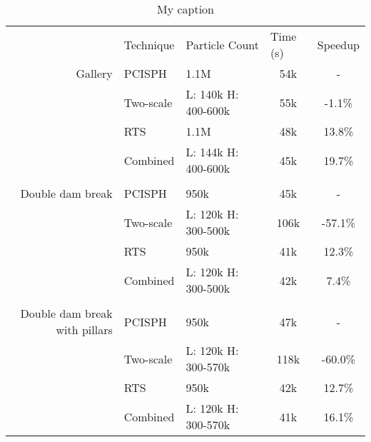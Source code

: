 \begin{table}[]
\centering
\caption{My caption}
\label{my-label}
\begin{tabular}{rllcc}
\multicolumn{1}{l}{}          & Technique & Particle Count      & \multicolumn{1}{l}{Time (s)} & \multicolumn{1}{l}{Speedup} \\ \cline{2-5} 
Gallery                       & PCISPH    & 1.1M                & 54k                          & -                           \\
                              & Two-scale & L: 140k H: 400-600k & 55k                          & -1.1\%                      \\
                              & RTS       & 1.1M                & 48k                          & 13.8\%                      \\
                              & Combined  & L: 144k H: 400-600k & 45k                          & 19.7\%                      \\
                              &           &                     &                              &                             \\
Double dam break              & PCISPH    & 950k                & 45k                          & -                           \\
                              & Two-scale & L: 120k H: 300-500k & 106k                         & -57.1\%                     \\
                              & RTS       & 950k                & 41k                          & 12.3\%                      \\
                              & Combined  & L: 120k H: 300-500k & 42k                          & 7.4\%                       \\
                              &           &                     &                              &                             \\
Double dam break with pillars & PCISPH    & 950k                & 47k                          & -                           \\
\multicolumn{1}{l}{}          & Two-scale & L: 120k H: 300-570k & 118k                         & -60.0\%                     \\
\multicolumn{1}{l}{}          & RTS       & 950k                & 42k                          & 12.7\%                      \\
\multicolumn{1}{l}{}          & Combined  & L: 120k H: 300-570k & 41k                          & 16.1\%                     
\end{tabular}
\end{table}